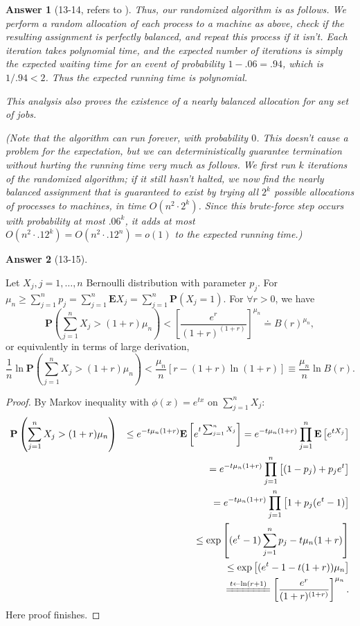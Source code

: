 \documentclass[11pt]{article}
\theoremstyle{numberplain}
\theoremstyle{nonumberplain}
\newtheorem{proof}{Proof}
\newtheorem{ans}{Answer}
\newcommand{\dps}{\displaystyle}
\newcommand{\0}{{\mathbf{0}}}
\newcommand{\E}{{\mathbf{E}}}
\renewcommand{\P}{{\mathbf{P}}}
\begin{document}
\begin{ans}[13-14, refers to \cite{solcornell}]
Thus, our randomized algorithm is as follows.
We perform a random allocation of each process to a machine as above,
check if the resulting assignment is perfectly balanced,
and repeat this process if it isn't.
Each iteration takes polynomial time,
and the expected number of iterations is simply the expected waiting
time for an event of probability $1 - .06 = .94$,
which is $1 / .94 < 2$.
Thus the expected running time is polynomial.

This analysis also proves the {\em existence} of a nearly
balanced allocation for any set of jobs.

(Note that the algorithm can run forever, with probability $0$.
This doesn't cause a problem for the expectation,
but we can deterministically guarantee termination without
hurting the running time very much as follows.
We first run $k$ iterations of the randomized algorithm;
if it still hasn't halted, we now find the
nearly balanced assignment that is guaranteed to exist
by trying all $2^k$ possible
allocations of processes to machines, in time
$O(n^2 \cdot 2^k)$.
Since this brute-force step occurs with probability
at most $.06^k$, it adds at most
$O(n^2 \cdot .12^k) = O(n^2 \cdot .12^n) = o(1)$
to the expected running time.)
\end{ans}

\begin{ans}[13-15]
\end{ans}

\begin{lem}
Let $X_j, j=1,\ldots,n$  Bernoulli distribution with parameter $p_j$. For $\dps \mu_n\geq \sum_{j=1}^np_j=\sum_{j=1}^n \E X_j=\sum_{j=1}^n \P (X_j=1)$. For $\forall r>0$, we have 
$$
\P\left(
\sum_{j=1}^n X_j >(1+r)\mu_n
\right)<\left[\frac{e^{r}}{(1+r)^{(1+r)}} \right]^{\mu_n}\doteq B(r)^{\mu_n},
$$
or equivalently in terms of large derivation, 
$$
\frac1n\ln \P\left(
\sum_{j=1}^n X_j >(1+r)\mu_n
\right)<\frac{\mu_n}{n}\left[r-(1+r)\ln (1+r) \right]\equiv \frac{\mu_n}{n}\ln B(r).
$$
\end{lem}
\begin{proof}
By Markov inequality with $\phi(x)=e^{t x}$ on $\sum_{j=1}^n X_j$:
\begin{eqnarray*}
\P\left(
\sum_{j=1}^n X_j>(1+r)\mu_n
\right) && \leq e^{-t\mu_n (1+r)}\E\left[
e^{t\sum_{j=1}^n X_j}\right] =e^{-t\mu_n (1+r)}\prod_{j=1}^n\E\left[
e^{t X_j}\right] \\
&& =e^{-t\mu_n (1+r)}\prod_{j=1}^n\left[
(1-p_j)+p_je^{t}\right] \\
&& =e^{-t\mu_n (1+r)}\prod_{j=1}^n\left[
1+p_j(e^{t}-1)\right]\\
&&\leq  \exp \left[
(e^{t}-1)\sum_{j=1}^n p_j-t\mu_n (1+r)\right]\\
&& \leq  \exp \left[
(e^{t}-1-t(1+r))\mu_n \right] \\
&& \xlongequal{t\leftarrow\ln (r+1)}
\left[\frac{e^{r}}{(1+r)^{(1+r)}} \right]^{\mu_n}.
\end{eqnarray*}
Here proof finishes.
\end{proof}
\end{document}
